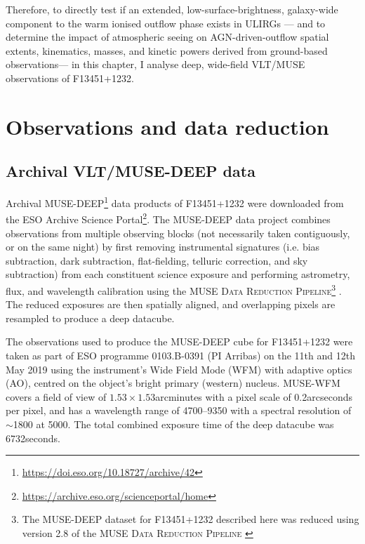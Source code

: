 Therefore, to directly test if an extended, low-surface-brightness, galaxy-wide component to the warm ionised outflow phase exists in ULIRGs --- and to determine the impact of atmospheric seeing on AGN-driven-outflow spatial extents, kinematics, masses, and kinetic powers derived from ground-based observations--- in this chapter, I analyse deep, wide-field VLT/MUSE observations of F13451+1232.

\section{Observations and data reduction}

\subsection{Archival VLT/MUSE-DEEP data}
\label{section: section: muse_f13451_1232: observations_and_data_reduction: observations}

Archival MUSE-DEEP\footnote{\url{https://doi.eso.org/10.18727/archive/42}} data products of F13451+1232 were downloaded from the ESO Archive Science Portal\footnote{\url{https://archive.eso.org/scienceportal/home}}. The MUSE-DEEP data project combines observations from multiple observing blocks (not necessarily taken contiguously, or on the same night) by first removing instrumental signatures (i.e. bias subtraction, dark subtraction, flat-fielding, telluric correction, and sky subtraction) from each constituent science exposure and performing astrometry, flux, and wavelength calibration using the \textsc{MUSE Data Reduction Pipeline}\footnote{The MUSE-DEEP dataset for F13451+1232 described here was reduced using version 2.8 of the \textsc{MUSE Data Reduction Pipeline} \citep{Weilbacher2020}} \citep{Weilbacher2020}. The reduced exposures are then spatially aligned, and overlapping pixels are resampled to produce a deep datacube.

The observations used to produce the MUSE-DEEP cube for F13451+1232 were taken as part of ESO programme 0103.B-0391 (PI Arribas) on the 11th and 12th May 2019 using the instrument's Wide Field Mode (WFM) with adaptive optics (AO), centred on the object's bright primary (western) nucleus. MUSE-WFM covers a field of view of $1.53\times1.53$\;arcminutes with a pixel scale of 0.2\;arcseconds per pixel, and has a wavelength range of 4700--9350\;{\AA} with a spectral resolution of $\sim$1800 at 5000\;{\AA}. The total combined exposure time of the deep datacube was 6732\;seconds.

